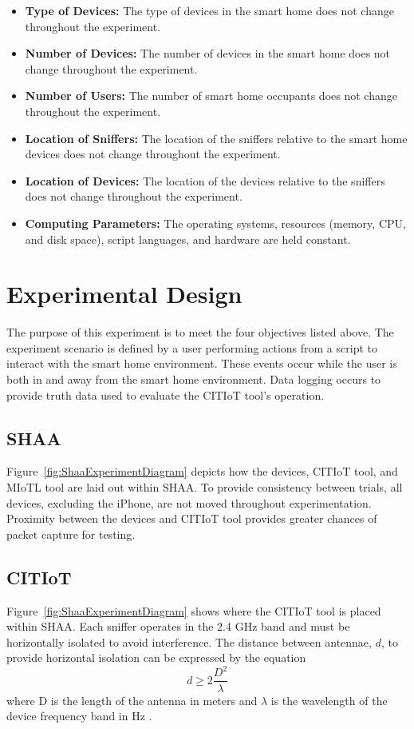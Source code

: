 \documentclass[12pt,letterpaper,oneside]{book}
\begin{document}
		\begin{itemize}
			\item \textbf{Type of Devices:} The type of devices in the smart home does not change throughout the experiment.
			\item \textbf{Number of Devices:} The number of devices in the smart home does not change throughout the experiment.
			\item \textbf{Number of Users:} The number of smart home occupants does not change throughout the experiment.
			\item \textbf{Location of Sniffers:} The location of the sniffers relative to the smart home devices does not change throughout the experiment.
			\item \textbf{Location of Devices:} The location of the devices relative to the sniffers does not change throughout the experiment.
			\item \textbf{Computing Parameters:} The operating systems, resources (memory, CPU, and disk space), script languages, and hardware are held constant.
		\end{itemize}
		
		\section{Experimental Design}
		
		The purpose of this experiment is to meet the four objectives listed above. The experiment scenario is defined by a user performing actions from a script to interact with the smart home environment. These events occur while the user is both in and away from the smart home environment. Data logging occurs to provide truth data used to evaluate the \ac{CITIoT} tool's operation.
		
			\subsection{\acf{SHAA}}
			
			Figure~\ref{fig:ShaaExperimentDiagram} depicts how the devices, \ac{CITIoT} tool, and \ac{MIoTL} tool are laid out within \ac{SHAA}. To provide consistency between trials, all devices, excluding the iPhone, are not moved throughout experimentation. Proximity between the devices and \ac{CITIoT} tool provides greater chances of packet capture for testing.
			
			\figShaaExperimentDiagram
			
			\subsection{\ac{CITIoT}}
			Figure~\ref{fig:ShaaExperimentDiagram} shows where the \ac{CITIoT} tool is placed within \ac{SHAA}. Each sniffer operates in the 2.4 GHz band and must be horizontally isolated to avoid interference. The distance between antennae, $d$, to provide horizontal isolation can be expressed by the equation
			\begin{equation}
			d\geq 2 \frac{D^2}{\lambda}
			\end{equation}
			where D is the length of the antenna in meters and $\lambda$ is the wavelength of the device frequency band in Hz \cite{antenna}.
			
\end{document}
